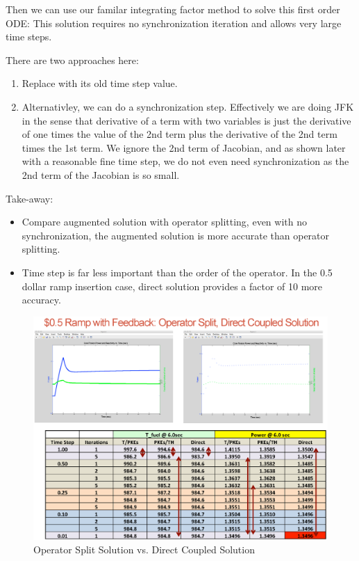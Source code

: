 \documentclass{school-22.211-notes}
\begin{document}
Then we can use our familar integrating factor method to solve this first order ODE: 
This solution requires no synchronization iteration and allows very large time steps. 

There are two approaches here:
\begin{enumerate}
\item Replace with its old time step value. 

\item Alternativley, we can do a synchronization step. Effectively we are doing JFK in the sense that derivative of a term with two variables is just the derivative of one times the value of the 2nd term plus the derivative of the 2nd term times the 1st term. We ignore the 2nd term of Jacobian, and as shown later with a reasonable fine time step, we do not even need synchronization as the 2nd term of the Jacobian is so small. 
\end{enumerate}

Take-away: 
\begin{itemize}
\item Compare augmented solution with operator splitting, even with no synchronization, the augmented solution is more accurate than operator splitting. 

\item Time step is far less important than the order of the operator. In the 0.5 dollar ramp insertion case, direct solution provides a factor of 10 more accuracy. 
\end{itemize}

\begin{figure}[h]
  \centering
  \includegraphics[width=5in]{images/pke/operator-split-vs-direct.png}
  \caption{Operator Split Solution vs. Direct Coupled Solution} 
\end{figure}
\end{document}
